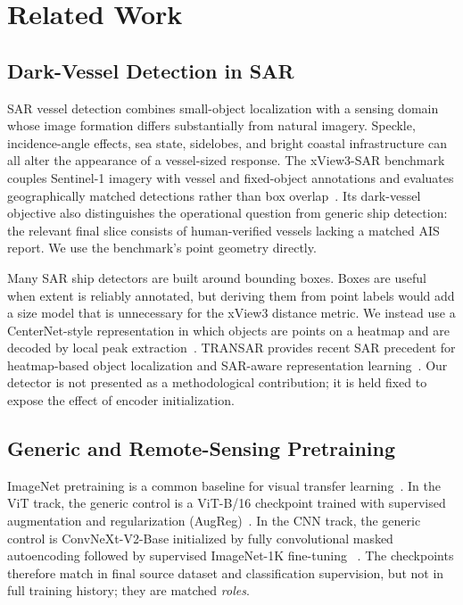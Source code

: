 \section{Related Work}
\label{sec:related}

\subsection{Dark-Vessel Detection in SAR}

SAR vessel detection combines small-object localization with a sensing domain
whose image formation differs substantially from natural imagery. Speckle,
incidence-angle effects, sea state, sidelobes, and bright coastal
infrastructure can all alter the appearance of a vessel-sized response. The
xView3-SAR benchmark couples Sentinel-1 imagery with vessel and fixed-object
annotations and evaluates geographically matched detections rather than box
overlap~\cite{paolo2022xview3}. Its dark-vessel objective also distinguishes
the operational question from generic ship detection: the relevant final
slice consists of human-verified vessels lacking a matched AIS report. We use
the benchmark's point geometry directly.

Many SAR ship detectors are built around bounding boxes. Boxes are useful when
extent is reliably annotated, but deriving them from point labels would add a
size model that is unnecessary for the xView3 distance metric. We instead use
a CenterNet-style representation in which objects are points on a heatmap and
are decoded by local peak extraction~\cite{zhou2019objects}. TRANSAR provides
recent SAR precedent for heatmap-based object localization and SAR-aware
representation learning~\cite{almalioglu2025transar}. Our detector is not
presented as a methodological contribution; it is held fixed to expose the
effect of encoder initialization.

\subsection{Generic and Remote-Sensing Pretraining}

ImageNet pretraining is a common baseline for visual transfer
learning~\cite{deng2009imagenet}. In the ViT track, the generic control is a
ViT-B/16 checkpoint trained with supervised augmentation and regularization
(AugReg)~\cite{dosovitskiy2021image,steiner2021trainvit}. In the CNN track, the
generic control is ConvNeXt-V2-Base initialized by fully convolutional masked
autoencoding followed by supervised ImageNet-1K fine-tuning
~\cite{woo2023convnextv2}. The checkpoints therefore match in final source
dataset and classification supervision, but not in full training history;
they are matched \emph{roles}.

